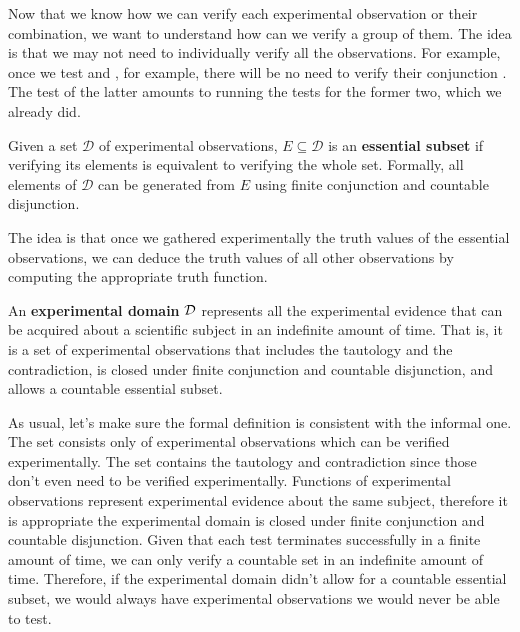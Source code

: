 \documentclass[11pt,letterpaper,fleqn]{memoir} %
\begin{document}
Now that we know how we can verify each experimental observation or their combination, we want to understand how can we verify a group of them. The idea is that we may not need to individually verify all the observations. For example, once we test  and , for example, there will be no need to verify their conjunction . The test of the latter amounts to running the tests for the former two, which we already did.

\begin{mathSection}
	\begin{defn}
		Given a set $\mathcal{D}$ of experimental observations, $E \subseteq \mathcal{D}$ is an \textbf{essential subset} if verifying its elements is equivalent to verifying the whole set. Formally, all elements of $\mathcal{D}$ can be generated from $E$ using finite conjunction and countable disjunction.
	\end{defn}
\end{mathSection}

The idea is that once we gathered experimentally the truth values of the essential observations, we can deduce the truth values of all other observations by computing the appropriate truth function.

\begin{mathSection}
\begin{defn}
	An \textbf{experimental domain} $\mathcal{D}$ represents all the experimental evidence that can be acquired about a scientific subject in an indefinite amount of time. That is, it is a set of experimental observations that includes the tautology and the contradiction, is closed under finite conjunction and countable disjunction, and allows a countable essential subset.
\end{defn}
\begin{justification}
	As usual, let's make sure the formal definition is consistent with the informal one. The set consists only of experimental observations which can be verified experimentally. The set contains the tautology and contradiction since those don't even need to be verified experimentally. Functions of experimental observations represent experimental evidence about the same subject, therefore it is appropriate the experimental domain is closed under finite conjunction and countable disjunction. Given that each test terminates successfully in a finite amount of time, we can only verify a countable set in an indefinite amount of time. Therefore, if the experimental domain didn't allow for a countable essential subset, we would always have experimental observations we would never be able to test.
\end{justification}
\end{mathSection}
\end{document}
